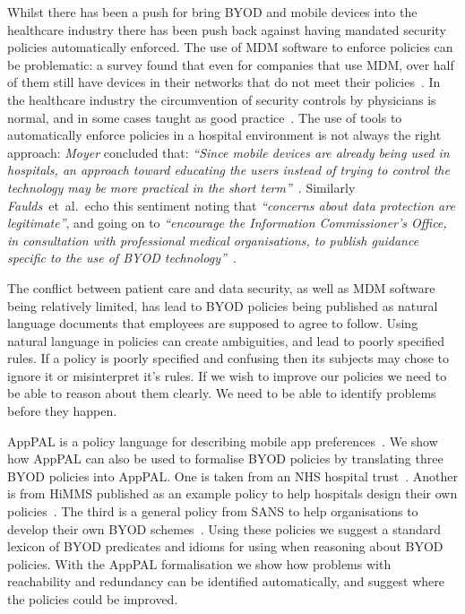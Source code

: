 \documentclass[a4paper]{article}
\makeatletter
\newcommand{\etal}[0]{et~al{.}\@}
\newcommand{\apppal}[0]{App{P}{A}{L}}
\makeatother
\begin{document}
Whilst there has been a push for bring \ac{BYOD} and mobile devices into the healthcare industry there has been push back against having mandated security policies automatically enforced.  
The use of \ac{MDM} software to enforce policies can be problematic:
  a survey found that even for companies that use \ac{MDM}, over half of them still have devices in their networks that do not meet their policies~\cite{mobileiron_security_labs_q4_2015}.
In the healthcare industry the circumvention of security controls by physicians is normal, and in some cases taught as good practice~\cite{koppel_workarounds_2015}.
The use of tools to automatically enforce policies in a hospital environment is not always the right approach:
\emph{Moyer} concluded that:
\emph{``Since mobile devices are already being used in hospitals, an approach toward educating the users instead of trying to control the technology may be more practical in the short term''}~\cite{moyer_managing_2013}.
Similarly \emph{Faulds}~\etal~echo this sentiment noting that \emph{``concerns about data protection are legitimate''}, and going on to \emph{``encourage the Information Commissioner’s Office, in consultation with professional medical organisations, to publish guidance specific to the use of BYOD technology''}~\cite{faulds_feasibility_2016}.

The conflict between patient care and data security, as well as \ac{MDM} software being relatively limited, has lead to \ac{BYOD} policies being published as natural language documents that employees are supposed to agree to follow.
Using natural language in policies can create ambiguities, and lead to poorly specified rules.
If a policy is poorly specified and confusing then its subjects may chose to ignore it or misinterpret it's rules.
If we wish to improve our policies we need to be able to reason about them clearly.
We need to be able to identify problems before they happen.


\apppal{} is a policy language for describing mobile app preferences~\cite{hallett_apppal_2016}.
We show how \apppal{} can also be used to formalise \ac{BYOD} policies by translating three \ac{BYOD} policies into \apppal{}.
One is taken from an NHS hospital trust~\cite{kennington_mobiles_2014}. 
Another is from \ac{HiMMS} published as an example policy to help hospitals design their own policies~\cite{healthcare_information_and_management_systems_society_mobile_2012}.
The third is a  general policy from SANS to help organisations to develop their own \ac{BYOD} schemes~\cite{nicholas_r._c._guerin_security_2008}.
Using these policies we suggest a standard lexicon of BYOD predicates and idioms for using when reasoning about \ac{BYOD} policies. 
With the AppPAL formalisation we show how problems with reachability and redundancy can be identified automatically, and suggest where the policies could be improved.
\end{document}
